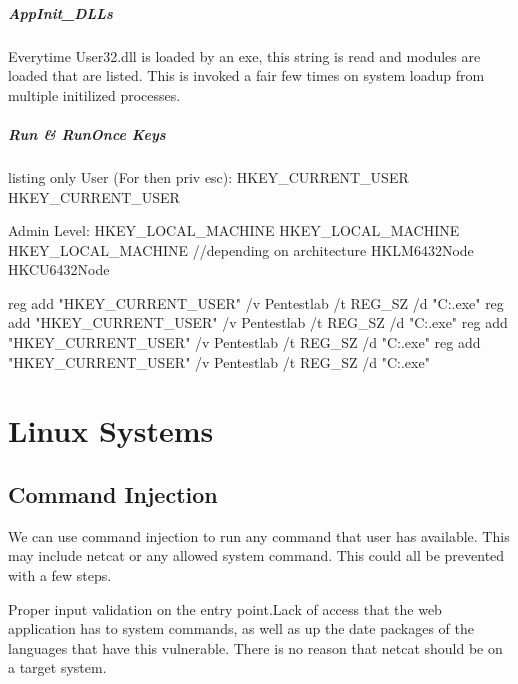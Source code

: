 \subparagraph{AppInit_DLLs}
Everytime User32.dll is loaded by an exe, this string is read and modules are loaded that are listed. This is invoked a fair few times on system loadup from multiple initilized processes.


\subparagraph{Run & RunOnce Keys}

\begin{tcblisting}{listing only}
User (For then priv esc):
HKEY_CURRENT_USER\Software\Microsoft\Windows\CurrentVersion\Run
HKEY_CURRENT_USER\Software\Microsoft\Windows\CurrentVersion\RunOnce

Admin Level:
HKEY_LOCAL_MACHINE\SOFTWARE\Microsoft\Windows\CurrentVersion\Run
HKEY_LOCAL_MACHINE\SOFTWARE\Microsoft\Windows\CurrentVersion\RunOnce
HKEY_LOCAL_MACHINE\Software\Microsoft\Windows\CurrentVersion\Policies\Explorer\Run
//depending on architecture
HKLM\Software\Wow6432Node\Microsoft\Windows\CurrentVersion\Run
HKCU\Software\Wow6432Node\Microsoft\Windows\CurrentVersion\RunOnce

reg add "HKEY_CURRENT_USER\Software\Microsoft\Windows\CurrentVersion\Run" /v Pentestlab /t REG_SZ /d "C:\Users\pentestlab\pentestlab.exe"
reg add "HKEY_CURRENT_USER\Software\Microsoft\Windows\CurrentVersion\RunOnce" /v Pentestlab /t REG_SZ /d "C:\Users\pentestlab\pentestlab.exe"
reg add "HKEY_CURRENT_USER\Software\Microsoft\Windows\CurrentVersion\RunServices" /v Pentestlab /t REG_SZ /d "C:\Users\pentestlab\pentestlab.exe"
reg add "HKEY_CURRENT_USER\Software\Microsoft\Windows\CurrentVersion\RunServicesOnce" /v Pentestlab /t REG_SZ /d "C:\Users\pentestlab\pentestlab.exe"

\end{tcblisting}

\section{Linux Systems}
\subsection{Command Injection}
We can use command injection to run any command that user has available. This may include netcat or any allowed system command. This could all be prevented with a few steps. 

Proper input validation on the entry point.Lack of access that the web application has to system commands, as well as up the date packages of the languages that have this vulnerable. There is no reason that netcat should be on a target system. 


